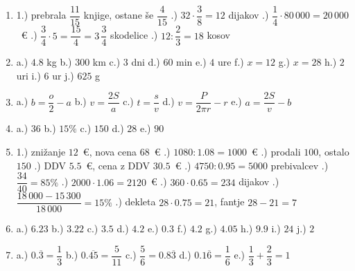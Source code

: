 \documentclass[a4paper,12pt]{letter}
\begin{document}
\begin{enumerate}
\item 1.) prebrala $\dfrac{11}{15}$ knjige, ostane \v{s}e $\dfrac{4}{15}$ .) $32\cdot\dfrac{3}{8}=12$ dijakov .) $\dfrac{1}{4}\cdot80\,000=20\,000$~\euro{} .) $\dfrac{3}{4}\cdot5=\dfrac{15}{4}=3\,\dfrac{3}{4}$ skodelice .) $12:\dfrac{2}{3}=18$ kosov

\item a.) $4.8$ kg \quad b.) $300$ km \quad c.) $3$ dni \quad d.) $60$ min \quad e.) $4$ ure \quad
      f.) $x=12$ \quad g.) $x=28$ \quad h.) $2$ uri \quad i.) $6$ ur \quad j.) $625$ g

\item a.) $b=\dfrac{o}{2}-a$ \quad b.) $v=\dfrac{2S}{a}$ \quad c.) $t=\dfrac{s}{v}$ \quad
      d.) $v=\dfrac{P}{2\pi r}-r$ \quad e.) $a=\dfrac{2S}{v}-b$

\item a.) $36$ \quad b.) $15\%$ \quad c.) $150$ \quad d.) $28$ \quad e.) $90$

\item 1.) zni\v{z}anje $12$~\euro{}, nova cena $68$~\euro{} .) $1080:1.08=1000$~\euro{} .) prodali $100$, ostalo $150$ .) DDV $5.5$~\euro{}, cena z DDV $30.5$~\euro{} .) $4750:0.95=5000$ prebivalcev .) $\dfrac{34}{40}=85\%$ .) $2000\cdot1.06=2120$~\euro{} .) $360\cdot0.65=234$ dijakov .) $\dfrac{18\,000-15\,300}{18\,000}=15\%$ .) dekleta $28\cdot0.75=21$, fantje $28-21=7$

\item a.) $6.23$ \quad b.) $3.22$ \quad c.) $3.5$ \quad d.) $4.2$ \quad e.) $0.3$ \quad
      f.) $4.2$ \quad g.) $4.05$ \quad h.) $9.9$ \quad i.) $24$ \quad j.) $2$

\item a.) $0.\overline{3}=\dfrac{1}{3}$ \quad b.) $0.\overline{45}=\dfrac{5}{11}$ \quad
      c.) $\dfrac{5}{6}=0.8\overline{3}$ \quad d.) $0.1\overline{6}=\dfrac{1}{6}$ \quad
      e.) $\dfrac{1}{3}+\dfrac{2}{3}=1$
\end{enumerate}
\end{document}
